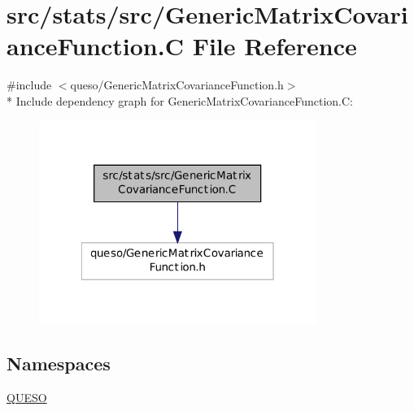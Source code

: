 \hypertarget{_generic_matrix_covariance_function_8_c}{\section{src/stats/src/\-Generic\-Matrix\-Covariance\-Function.C File Reference}
\label{_generic_matrix_covariance_function_8_c}
}
{\ttfamily \#include $<$queso/\-Generic\-Matrix\-Covariance\-Function.\-h$>$}\\*
Include dependency graph for Generic\-Matrix\-Covariance\-Function.\-C\-:
\nopagebreak
\begin{figure}[H]
\begin{center}
\leavevmode
\includegraphics[width=256pt]{_generic_matrix_covariance_function_8_c__incl}
\end{center}
\end{figure}
\subsection*{Namespaces}
\begin{DoxyCompactItemize}
\item 
\hyperlink{namespace_q_u_e_s_o}{Q\-U\-E\-S\-O}
\end{DoxyCompactItemize}
